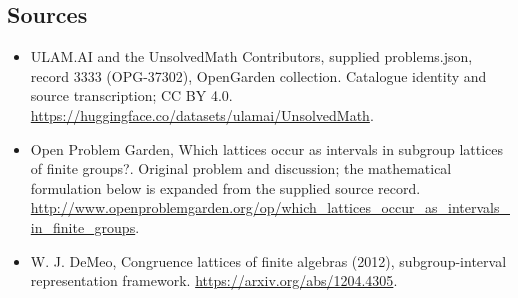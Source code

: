 \documentclass[11pt,a4paper]{article}
\begin{document}
\subsection{Sources}
\begin{itemize}
\item[S1] ULAM.AI and the UnsolvedMath Contributors, supplied problems.json, record 3333 (OPG-37302), OpenGarden collection. Catalogue identity and source transcription; CC BY 4.0.
\url{https://huggingface.co/datasets/ulamai/UnsolvedMath}.
\item[S2] Open Problem Garden, Which lattices occur as intervals in subgroup lattices of finite groups?. Original problem and discussion; the mathematical formulation below is expanded from the supplied source record.
\url{http://www.openproblemgarden.org/op/which_lattices_occur_as_intervals_in_finite_groups}.
\item[S3] W. J. DeMeo, Congruence lattices of finite algebras (2012), subgroup-interval representation framework.
\url{https://arxiv.org/abs/1204.4305}.
\end{itemize}
\end{document}
